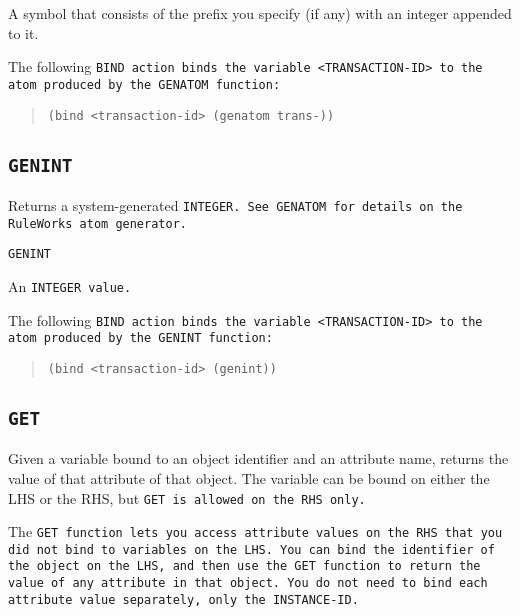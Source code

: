 \ReturnValue

A symbol that consists of the prefix you specify (if any) with an
integer appended to it.

\Example

The following \tt{BIND} action binds the variable \tt{<TRANSACTION-ID>}
to the atom produced by the \tt{GENATOM} function:

\begin{quote}
\begin{verbatim}
(bind <transaction-id> (genatom trans-))
\end{verbatim}
\end{quote}

\subsection{\tt{GENINT}}

Returns a system-generated \tt{INTEGER}. See \tt{GENATOM} for details
on the RuleWorks atom generator.

\Format

\tt{GENINT}

\ReturnValue

An \tt{INTEGER} value.

\Example

The following \tt{BIND} action binds the variable \tt{<TRANSACTION-ID>}
to the atom produced by the \tt{GENINT} function:

\begin{quote}
\begin{verbatim}
(bind <transaction-id> (genint))
\end{verbatim}
\end{quote}

\subsection{\tt{GET}}

Given a variable bound to an object identifier and an attribute name,
returns the value of that attribute of that object. The variable can
be bound on either the LHS or the RHS, but \tt{GET} is allowed on the
RHS only.

The \tt{GET} function lets you access attribute values on the RHS that
you did not bind to variables on the LHS. You can bind the identifier
of the object on the LHS, and then use the \tt{GET} function to return
the value of any attribute in that object.  You do not need to bind
each attribute value separately, only the \tt{INSTANCE-ID}.

